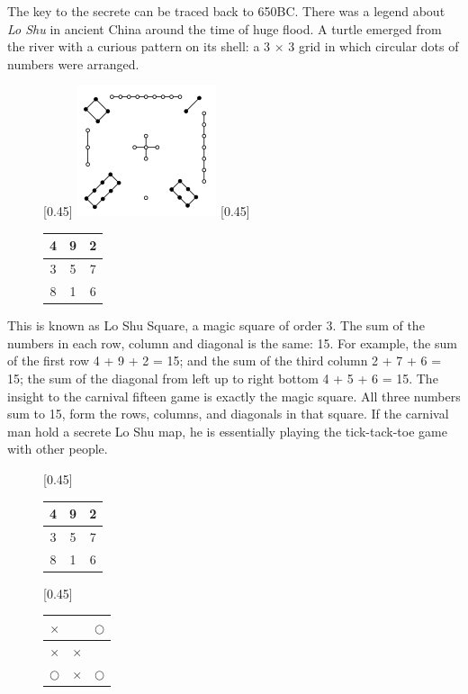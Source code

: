 \documentclass[UTF8]{article}
\begin{document}
The key to the secrete can be traced back to 650BC. There was a legend about {\em Lo Shu} in ancient China around the time of huge flood. A turtle emerged from the river with a curious pattern on its shell: a 3 $\times$ 3 grid in which circular dots of numbers were arranged.

\begin{figure}[htbp]
 \centering
 [0.45\linewidth]{ \includegraphics[scale=0.6]{img/luo-shu.png}}
 [0.45\linewidth]{
   \begin{tabular}{|c|c|c|}
   \hline
   4 & 9 & 2 \\
   \hline
   3 & 5 & 7 \\
   \hline
   8 & 1 & 6 \\
   \hline
   \end{tabular}
   \vspace{8mm}
 }
 \captionsetup{labelformat=empty}
 \caption{}
 \label{fig:luo-shu}
\end{figure}

This is known as Lo Shu Square, a magic square of order 3. The sum of the numbers in each row, column and diagonal is the same: 15. For example, the sum of the first row 4 + 9 + 2 = 15; and the sum of the third column 2 + 7 + 6 = 15; the sum of the diagonal from left up to right bottom 4 + 5 + 6 = 15. The insight to the carnival fifteen game is exactly the magic square. All three numbers sum to 15, form the rows, columns, and diagonals in that square. If the carnival man hold a secrete Lo Shu map, he is essentially playing the tick-tack-toe game with other people.

\begin{figure}[htbp]
 \centering
 [0.45\linewidth]{
   \begin{tabular}{|c|c|c|}
   \hline
   4 & 9 & 2 \\
   \hline
   3 & 5 & 7 \\
   \hline
   8 & 1 & 6 \\
   \hline
   \end{tabular}
   \vspace{3mm}
 }
 [0.45\linewidth]{
   \begin{tabular}{c|c|c}
   $\times$ &  & $\bigcirc$ \\
   \hline
   $\times$ & $\times$ &  \\
   \hline
   $\bigcirc$ & $\times$ & $\bigcirc$ \\
   \end{tabular}
   \vspace{3mm}
 }
 \captionsetup{labelformat=empty}
 \caption{}
 \label{fig:bingo-magic-square}
\end{figure}
\end{document}
